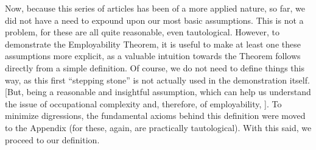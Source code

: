 \documentclass[hidelinks, nonatbib]{elsarticle}
\begin{document}

Now, because this series of articles has been of a more applied nature, so far, we did not have a need to expound upon our most basic assumptions. This is not a problem, for these are all quite reasonable, even tautological. However, to demonstrate the Employability Theorem, it is useful to make at least one these assumptions more explicit, as a valuable intuition towards the Theorem follows directly from a simple definition. Of course, we do not need to define things this way, as this first ``stepping stone'' is not actually used in the demonstration itself. [But, being a reasonable and insightful assumption, which can help us understand the issue of occupational complexity and, therefore, of employability, ]. To minimize digressions, the fundamental axioms behind this definition were moved to the Appendix (for these, again, are practically tautological). With this said, we proceed to our definition.

\SklTasks
\SklDifficulty
\SSL
\ComplexTask
\SCA
\end{document}
